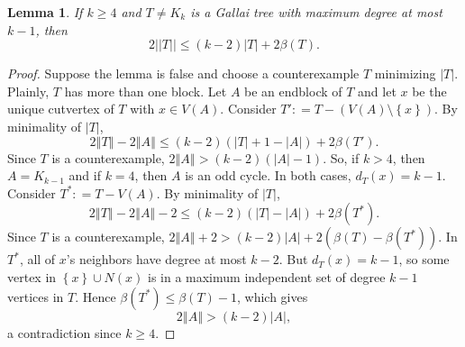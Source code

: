 \documentclass[12pt]{article}
\theoremstyle{plain}
\newtheorem{lem}[thm]{Lemma}
\theoremstyle{definition}
\theoremstyle{remark}
\newcommand{\set}[1]{\left\{ #1 \right\}}
\newcommand{\card}[1]{\left|#1\right|}
\newcommand{\size}[1]{\left\Vert#1\right\Vert}
\newcommand{\DefinedAs}{\mathrel{\mathop:}=}
\begin{document}
\begin{lem}\label{BetaaaBound}
	If $k \ge 4$ and $T \ne K_k$ is a Gallai tree with maximum degree at most $k-1$, then
	\[2||T|| \le (k-2)|T| + 2\beta(T).\]
\end{lem}
\begin{proof}
	Suppose the lemma is false and choose a counterexample $T$ minimizing $\card{T}$.  Plainly, $T$ has more than one block.  Let $A$ be an endblock of $T$ and let $x$ be the unique cutvertex of $T$ with $x \in V(A)$.
	Consider $T' \DefinedAs T - (V(A)\setminus\set{x})$.  By minimality of $\card{T}$,
	\begin{equation*}
		2\size{T} - 2\size{A} \le (k-2)(\card{T} + 1 - \card{A}) + 2\beta(T').
	\end{equation*}
		Since $T$ is a counterexample, $2\size{A} > (k-2)(\card{A} - 1)$.  So, if $k > 4$, then $A = K_{k-1}$ and if $k=4$, then $A$ is an odd cycle.  In both cases, $d_T(x) = k-1$.
	Consider $T^* \DefinedAs T - V(A)$.  By minimality of $\card{T}$,
	\begin{equation*}
	2\size{T} - 2\size{A} - 2 \le (k-2)(\card{T} - \card{A}) + 2\beta(T^*).
	\end{equation*}
	Since $T$ is a counterexample, $2\size{A} + 2 > (k-2)\card{A} + 2(\beta(T) - \beta(T^*))$.  In $T^*$, all of $x$'s neighbors have degree at most $k-2$.
	But $d_T(x) = k-1$, so some vertex in $\set{x} \cup N(x)$ is in a maximum independent set of degree $k-1$ vertices in $T$.  Hence $\beta(T^*) \le \beta(T) - 1$, which gives
	\begin{equation*}
	 2\size{A} > (k-2)\card{A},
	\end{equation*}
	a contradiction since $k \ge 4$.
\end{proof}
\end{document}
